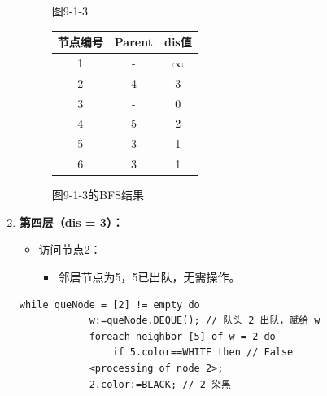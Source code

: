 \documentclass{article}
\begin{document}
\begin{enumerate}
\begin{figure}[htbp]
\begin{minipage}[b]{0.6\textwidth}
            \caption{图9-1-3}
            \label{fig:9-1-3}
        \end{minipage}%
        \hfill%
        \begin{minipage}[b]{0.4\textwidth}    %
            \centering
            \begin{tabular}{|c|c|c|}
                \hline
                节点编号 & Parent & dis值 \\
                \hline
                1 & - & $\infty$ \\
                2 & 4 & 3 \\
                3 & - & 0 \\
                4 & 5 & 2 \\
                5 & 3 & 1 \\
                6 & 3 & 1 \\
                \hline
            \end{tabular}
            \caption{图9-1-3的BFS结果}
            \label{tab:graph9-1-3-bfs}
        \end{minipage}
    \end{figure}

    \pagebreak
    \item \textbf{第四层（dis = 3）：}
    \begin{itemize}
        \item 访问节点2：
        \begin{itemize}
            \item 邻居节点为5，5已出队，无需操作。
        \end{itemize}
    \end{itemize}
    
    \begin{lstlisting}[style=algorithmPPT]
        while queNode = [2] != empty do
            w:=queNode.DEQUE(); // 队头 2 出队，赋给 w
            foreach neighbor [5] of w = 2 do 
                if 5.color==WHITE then // False
            <processing of node 2>;
            2.color:=BLACK; // 2 染黑        
        \end{lstlisting}    


\end{enumerate}
\end{document}
